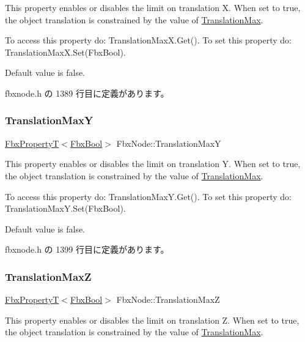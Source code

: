 This property enables or disables the limit on translation X. When set to {\ttfamily true}, the object translation is constrained by the value of \hyperlink{class_fbx_node_ad5867ca599b10137c3caf2eb102eaff7}{Translation\+Max}.

To access this property do\+: Translation\+Max\+X.\+Get(). To set this property do\+: Translation\+Max\+X.\+Set(\+Fbx\+Bool).

Default value is false. 

 fbxnode.\+h の 1389 行目に定義があります。

\mbox{\label{class_fbx_node_a68ce7c657e10023ec08fc70461a3624e}} 
\subsubsection{\texorpdfstring{Translation\+MaxY}{TranslationMaxY}}
{\footnotesize\ttfamily \hyperlink{class_fbx_property_t}{Fbx\+PropertyT}$<$\hyperlink{fbxtypes_8h_a92e0562b2fe33e76a242f498b362262e}{Fbx\+Bool}$>$ Fbx\+Node\+::\+Translation\+MaxY}

This property enables or disables the limit on translation Y. When set to {\ttfamily true}, the object translation is constrained by the value of \hyperlink{class_fbx_node_ad5867ca599b10137c3caf2eb102eaff7}{Translation\+Max}.

To access this property do\+: Translation\+Max\+Y.\+Get(). To set this property do\+: Translation\+Max\+Y.\+Set(\+Fbx\+Bool).

Default value is false. 

 fbxnode.\+h の 1399 行目に定義があります。

\mbox{\label{class_fbx_node_a82452c5c84518939525f69ebbf1cd190}} 
\subsubsection{\texorpdfstring{Translation\+MaxZ}{TranslationMaxZ}}
{\footnotesize\ttfamily \hyperlink{class_fbx_property_t}{Fbx\+PropertyT}$<$\hyperlink{fbxtypes_8h_a92e0562b2fe33e76a242f498b362262e}{Fbx\+Bool}$>$ Fbx\+Node\+::\+Translation\+MaxZ}

This property enables or disables the limit on translation Z. When set to {\ttfamily true}, the object translation is constrained by the value of \hyperlink{class_fbx_node_ad5867ca599b10137c3caf2eb102eaff7}{Translation\+Max}.

